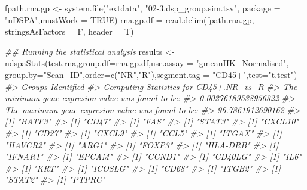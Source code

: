 \documentclass[]{article}
\newcommand{\hlnum}[1]{\textcolor[rgb]{0.816,0.125,0.439}{#1}}%
\newcommand{\hlstr}[1]{\textcolor[rgb]{0.251,0.627,0.251}{#1}}%
\newcommand{\hlcom}[1]{\textcolor[rgb]{0.502,0.502,0.502}{\textit{#1}}}%
\newcommand{\hlstd}[1]{\textcolor[rgb]{0.251,0.251,0.251}{#1}}%
\newenvironment{Shaded}{\begin{myshaded}}{\end{myshaded}}
\newcommand{\ConstantTok}[1]{\hlnum{#1}}
\newcommand{\StringTok}[1]{\hlstr{#1}}
\newcommand{\CommentTok}[1]{\hlcom{#1}}
\newcommand{\DocumentationTok}[1]{\hlcom{#1}}
\newcommand{\OtherTok}[1]{{#1}}
\newcommand{\FunctionTok}[1]{\hlstd{#1}}
\newcommand{\AttributeTok}[1]{{#1}}
\newcommand{\NormalTok}[1]{\hlstd{#1}}
\begin{document}
\begin{Shaded}
\begin{Highlighting}[]

\NormalTok{fpath.rna.gp }\OtherTok{\textless{}{-}} \FunctionTok{system.file}\NormalTok{(}\StringTok{"extdata"}\NormalTok{, }\StringTok{"02{-}3.dsp\_group.sim.tsv"}\NormalTok{, }\AttributeTok{package =} 
                           \StringTok{"nDSPA"}\NormalTok{,}\AttributeTok{mustWork =} \ConstantTok{TRUE}\NormalTok{)}
\NormalTok{rna.gp.df }\OtherTok{=} \FunctionTok{read.delim}\NormalTok{(fpath.rna.gp, }\AttributeTok{stringsAsFactors =}\NormalTok{ F, }\AttributeTok{header =}\NormalTok{ T)}

\DocumentationTok{\#\# Running the statistical analysis}
\NormalTok{results }\OtherTok{\textless{}{-}} \FunctionTok{ndspaStats}\NormalTok{(test.rna,}\AttributeTok{group.df=}\NormalTok{rna.gp.df,}\AttributeTok{use.assay =} \StringTok{"gmeanHK\_Normalised"}\NormalTok{, }\AttributeTok{group.by=}\StringTok{"Scan\_ID"}\NormalTok{,}\AttributeTok{order=}\FunctionTok{c}\NormalTok{(}\StringTok{"NR"}\NormalTok{,}\StringTok{"R"}\NormalTok{),}\AttributeTok{segment.tag =} \StringTok{"CD45+"}\NormalTok{,}\AttributeTok{test=}\StringTok{"t.test"}\NormalTok{)}
\CommentTok{\#\textgreater{} Groups Identified}
\CommentTok{\#\textgreater{} Computing Statistics for CD45+.NR\_vs\_R}
\CommentTok{\#\textgreater{} The minimum gene expresion value was found to be: }
\CommentTok{\#\textgreater{} 0.00276189538956322}
\CommentTok{\#\textgreater{} The maximum gene expresion value was found to be: }
\CommentTok{\#\textgreater{} 96.7861912690162}
\CommentTok{\#\textgreater{} [1] "BATF3"}
\CommentTok{\#\textgreater{} [1] "CD47"}
\CommentTok{\#\textgreater{} [1] "FAS"}
\CommentTok{\#\textgreater{} [1] "STAT3"}
\CommentTok{\#\textgreater{} [1] "CXCL10"}
\CommentTok{\#\textgreater{} [1] "CD27"}
\CommentTok{\#\textgreater{} [1] "CXCL9"}
\CommentTok{\#\textgreater{} [1] "CCL5"}
\CommentTok{\#\textgreater{} [1] "ITGAX"}
\CommentTok{\#\textgreater{} [1] "HAVCR2"}
\CommentTok{\#\textgreater{} [1] "ARG1"}
\CommentTok{\#\textgreater{} [1] "FOXP3"}
\CommentTok{\#\textgreater{} [1] "HLA{-}DRB"}
\CommentTok{\#\textgreater{} [1] "IFNAR1"}
\CommentTok{\#\textgreater{} [1] "EPCAM"}
\CommentTok{\#\textgreater{} [1] "CCND1"}
\CommentTok{\#\textgreater{} [1] "CD40LG"}
\CommentTok{\#\textgreater{} [1] "IL6"}
\CommentTok{\#\textgreater{} [1] "KRT"}
\CommentTok{\#\textgreater{} [1] "ICOSLG"}
\CommentTok{\#\textgreater{} [1] "CD68"}
\CommentTok{\#\textgreater{} [1] "ITGB2"}
\CommentTok{\#\textgreater{} [1] "STAT2"}
\CommentTok{\#\textgreater{} [1] "PTPRC"}

\end{Highlighting}
\end{Shaded}
\end{document}
